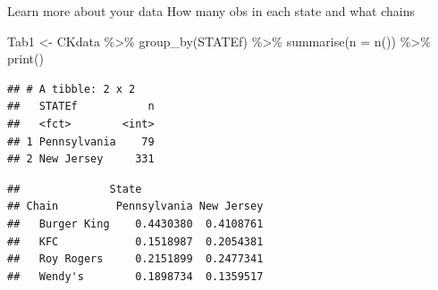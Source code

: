\documentclass[
  ignorenonframetext,
]{beamer}
\newenvironment{Shaded}{\begin{snugshade}}{\end{snugshade}}
\newcommand{\AttributeTok}[1]{\textcolor[rgb]{0.77,0.63,0.00}{#1}}
\newcommand{\DecValTok}[1]{\textcolor[rgb]{0.00,0.00,0.81}{#1}}
\newcommand{\FunctionTok}[1]{\textcolor[rgb]{0.00,0.00,0.00}{#1}}
\newcommand{\NormalTok}[1]{#1}
\newcommand{\OtherTok}[1]{\textcolor[rgb]{0.56,0.35,0.01}{#1}}
\newcommand{\SpecialCharTok}[1]{\textcolor[rgb]{0.00,0.00,0.00}{#1}}
\newcommand{\StringTok}[1]{\textcolor[rgb]{0.31,0.60,0.02}{#1}}
\begin{document}
\begin{frame}[fragile]{Learn more about your data}
\protect\hypertarget{learn-more-about-your-data-1}{}
How many obs in each state and what chains

\scriptsize

\begin{Shaded}
\begin{Highlighting}[]
\NormalTok{Tab1 }\OtherTok{\textless{}{-}}\NormalTok{ CKdata }\SpecialCharTok{\%\textgreater{}\%} \FunctionTok{group\_by}\NormalTok{(STATEf) }\SpecialCharTok{\%\textgreater{}\%} 
          \FunctionTok{summarise}\NormalTok{(}\AttributeTok{n =} \FunctionTok{n}\NormalTok{()) }\SpecialCharTok{\%\textgreater{}\%} 
          \FunctionTok{print}\NormalTok{()}
\end{Highlighting}
\end{Shaded}

\begin{verbatim}
## # A tibble: 2 x 2
##   STATEf           n
##   <fct>        <int>
## 1 Pennsylvania    79
## 2 New Jersey     331
\end{verbatim}

\begin{Shaded}
\end{Shaded}

\begin{verbatim}
##              State
## Chain         Pennsylvania New Jersey
##   Burger King    0.4430380  0.4108761
##   KFC            0.1518987  0.2054381
##   Roy Rogers     0.2151899  0.2477341
##   Wendy's        0.1898734  0.1359517
\end{verbatim}

\normalsize
\end{frame}
\end{document}
